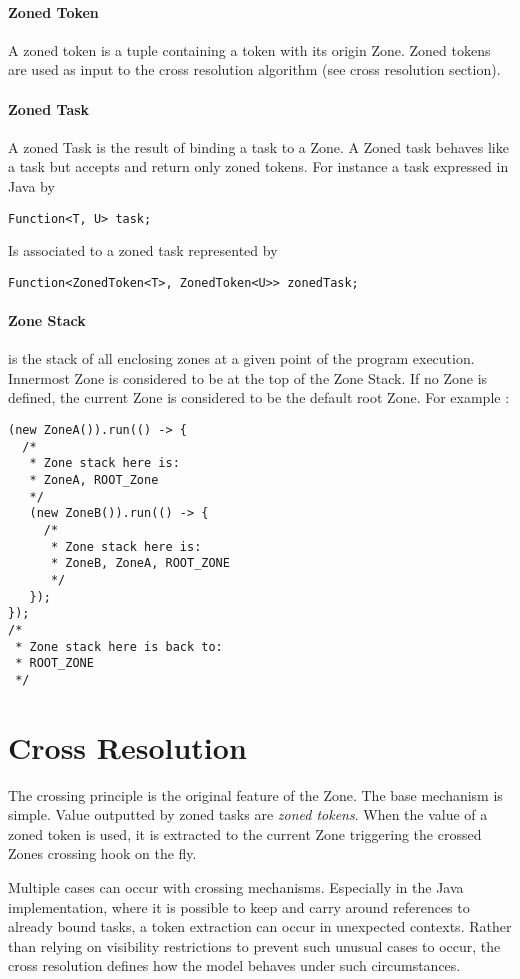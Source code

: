 \paragraph{Zoned Token} A zoned token is a tuple containing a token with its origin Zone. Zoned tokens are used as input to the cross resolution algorithm (see cross resolution section).

\paragraph{Zoned Task} A zoned Task is the result of binding a task to a Zone. A Zoned task behaves like a task but accepts and return only zoned tokens. For instance a task expressed in Java by
\begin{lstlisting}
Function<T, U> task;
\end{lstlisting}
Is associated to a zoned task represented by
\begin{lstlisting}
Function<ZonedToken<T>, ZonedToken<U>> zonedTask;
\end{lstlisting}

\paragraph{Zone Stack} is the stack of all enclosing zones at a given point of the program execution. Innermost Zone is considered to be at the top of the Zone Stack. If no Zone is defined, the current Zone is considered to be the default root Zone. For example :

\begin{lstlisting}
(new ZoneA()).run(() -> {
  /*
   * Zone stack here is:
   * ZoneA, ROOT_Zone
   */
   (new ZoneB()).run(() -> {
     /*
      * Zone stack here is:
      * ZoneB, ZoneA, ROOT_ZONE
      */
   });
});
/*
 * Zone stack here is back to:
 * ROOT_ZONE
 */
\end{lstlisting}

\section{Cross Resolution}

The crossing principle is the original feature of the Zone. The base mechanism is simple. Value outputted by zoned tasks are \emph{zoned tokens}. When the value of a zoned token is used, it is extracted to the current Zone triggering the crossed Zones crossing hook on the fly.

Multiple cases can occur with crossing mechanisms. Especially in the Java implementation, where it is possible to keep and carry around references to already bound tasks, a token extraction can occur in unexpected contexts. Rather than relying on visibility restrictions to prevent such unusual cases to occur, the cross resolution defines how the model behaves under such circumstances.

